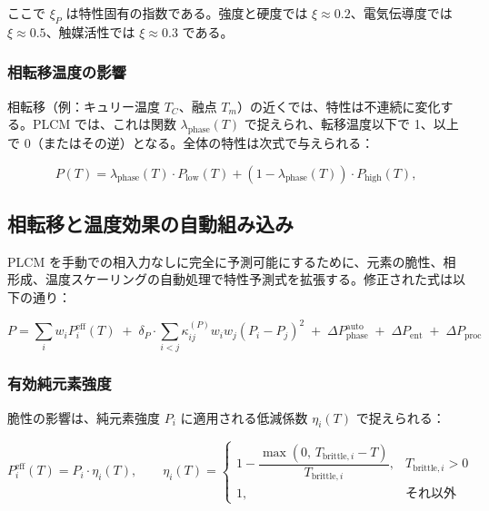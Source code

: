 \documentclass[11pt,a4paper]{article}
\theoremstyle{remark}
\begin{document}
	ここで \(\xi_P\) は特性固有の指数である。強度と硬度では \(\xi \approx 0.2\)、電気伝導度では \(\xi \approx 0.5\)、触媒活性では \(\xi \approx 0.3\) である。
	
	\subsubsection{相転移温度の影響}
	相転移（例：キュリー温度 \(T_C\)、融点 \(T_m\)）の近くでは、特性は不連続に変化する。PLCM では、これは関数 \(\lambda_{\text{phase}}(T)\) で捉えられ、転移温度以下で 1、以上で 0（またはその逆）となる。全体の特性は次式で与えられる：
	
	\begin{equation}
		P(T) = \lambda_{\text{phase}}(T) \cdot P_{\text{low}}(T) + (1-\lambda_{\text{phase}}(T)) \cdot P_{\text{high}}(T),
		\label{eq:phase-transition}
	\end{equation}
	
	\subsection{相転移と温度効果の自動組み込み}
	\label{subsec:auto-phase}
	
	PLCM を手動での相入力なしに完全に予測可能にするために、元素の脆性、相形成、温度スケーリングの自動処理で特性予測式を拡張する。修正された式は以下の通り：
	
	\begin{equation}
		\boxed{
			P = \sum_i w_i P_i^{\text{eff}}(T) \;+\; \delta_P \cdot \sum_{i<j} \kappa_{ij}^{(P)} w_i w_j (P_i - P_j)^2 \;+\; \Delta P_{\text{phase}}^{\text{auto}} \;+\; \Delta P_{\text{ent}} \;+\; \Delta P_{\text{proc}}
		}
		\label{eq:plcm-auto}
	\end{equation}
	
	\subsubsection{有効純元素強度}
	脆性の影響は、純元素強度 \(P_i\) に適用される低減係数 \(\eta_i(T)\) で捉えられる：
	
	\begin{equation}
		P_i^{\text{eff}}(T) = P_i \cdot \eta_i(T), \qquad
		\eta_i(T) = 
		\begin{cases}
			1 - \dfrac{\max(0,\, T_{\text{brittle},i} - T)}{T_{\text{brittle},i}}, & T_{\text{brittle},i} > 0 \\
			1, & \text{それ以外}
		\end{cases}
	\end{equation}
	
\end{document}
